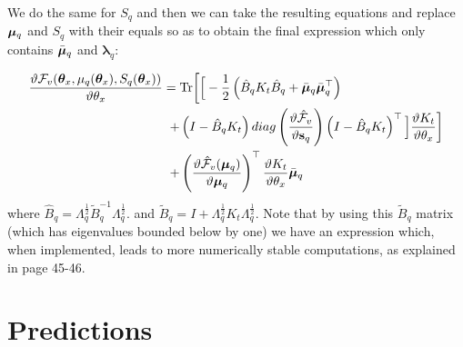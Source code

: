 We do the same for $S_q$ and then we can take the resulting equations and replace $\boldsymbol \mu_q$ and $S_q$ with their equals so as to obtain the final expression which only contains $\bar{\boldsymbol \mu}_q$ and $\boldsymbol \lambda_q$:

\begin{align}
\frac{\vartheta \mathcal{F}_v(\boldsymbol \theta_x, \mu_q(\boldsymbol \theta_x), S_q(\boldsymbol \theta_x))}{\vartheta \theta_x}
={}& \text{Tr} \bigg[
\Big[ - \frac{1}{2} \left( \hat{B}_q K_t \hat{B}_q + \bar{\boldsymbol \mu}_q \bar{\boldsymbol \mu}_q^{\top} \right) \nonumber \\
+{}& \left( I - \hat{B}_q K_t \right)
 diag \left(  \frac{\vartheta \hat{\mathcal{F}}_v}{\vartheta \mathbf{s}_q} \right)
			 \left( I - \hat{B}_q K_t \right)^{\top} \Big]
			  \frac{\vartheta K_t}{\vartheta \theta_x} \bigg] 	\nonumber \\	
+{}&  \left( \frac{\vartheta \hat{\mathcal{F}}_v( \boldsymbol \mu_q)}{\vartheta \boldsymbol \mu_q} \right)^{\top}
					\frac{\vartheta K_t}{\vartheta \theta_x} \bar{\boldsymbol \mu}_q 
\label{CompleteBoundDerivThetatB}
\end{align}
where $\hat{B}_q = \Lambda_q^{\frac{1}{2}} \widetilde{B}_q^{-1} \Lambda_q^{\frac{1}{2}}$.
and $\tilde{B}_q = I + \Lambda_q^{\frac{1}{2}} K_t \Lambda_q^{\frac{1}{2}}$. Note that by using this
$\tilde{B}_q$ matrix (which has eigenvalues bounded below by one) we have an expression which, when implemented, leads to more numerically stable computations, as explained in \cite{rasmussen-williams} page 45-46. 




\section{Predictions}


